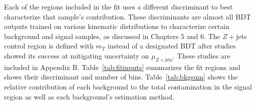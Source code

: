 Each of the regions included in the fit uses a different discriminant to best characterize that sample's contribution. These discriminants are almost all BDT outputs trained on various kinematic distributions to characterize certain background and signal samples, as discussed in Chapters 5 and 6. The $Z+$jets control region is defined with $m_T$ instead of a designated BDT after studies showed its success at mitigating uncertainty on $\mu_{Z+\text{jets}}$. These studies are included in Appendix B. Table~\ref{tab:fitinputs} summarizes the fit regions and shows their discriminant and number of bins. Table~\ref{tab:bkgsum} shows the relative contribution of each background to the total contamination in the signal region as well as each background's estimation method. 
\begin{table}[!h]
  \begin{center}
    \caption{Fit categories, including SR and CRs, distributions and number of bins used in the fit.}
    \label{tab:fitinputs}
  \end{center}
\end{table}

\begin{table}[h!]
\centering
{}
\caption{Each background's relative size in the signal region as a percentage of the total background contributions and estimation method}
\label{tab:bkgsum}
\end{table}

